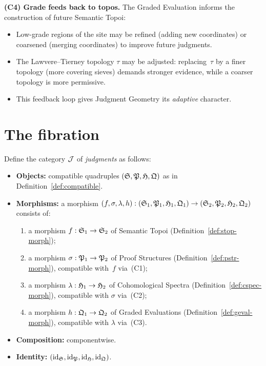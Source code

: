 \begin{definition}
\medskip
\noindent\textbf{(C4) Grade feeds back to topos.}
The Graded Evaluation informs the construction of future Semantic
Topoi:
\begin{itemize}[nosep]
\item Low-grade regions of the site may be refined (adding new
  coordinates) or coarsened (merging coordinates) to improve
  future judgments.
\item The Lawvere--Tierney topology $\tau$ may be adjusted:
  replacing~$\tau$ by a finer topology (more covering sieves)
  demands stronger evidence, while a coarser topology is more
  permissive.
\item This feedback loop gives Judgment Geometry its
  \emph{adaptive} character.
\end{itemize}
\end{definition}

\section{The fibration}
\label{sec:fibration-def}

\begin{construction}
\label{con:total-category}
Define the category $\mathcal{J}$ of \emph{judgments} as follows:
\begin{itemize}[nosep]
\item \textbf{Objects:} compatible quadruples
  $(\mathfrak{S}, \mathfrak{P}, \mathfrak{H}, \mathfrak{Q})$ as in
  Definition~\ref{def:compatible}.
\item \textbf{Morphisms:} a morphism
  $(f, \sigma, \lambda, h) :
  (\mathfrak{S}_1, \mathfrak{P}_1, \mathfrak{H}_1, \mathfrak{Q}_1) \to
  (\mathfrak{S}_2, \mathfrak{P}_2, \mathfrak{H}_2, \mathfrak{Q}_2)$
  consists of:
  \begin{enumerate}[label=(\alph*),nosep]
  \item a morphism $f : \mathfrak{S}_1 \to \mathfrak{S}_2$ of Semantic Topoi
    (Definition~\ref{def:stop-morph});
  \item a morphism $\sigma : \mathfrak{P}_1 \to \mathfrak{P}_2$ of Proof Structures
    (Definition~\ref{def:pstr-morph}), compatible with~$f$ via~(C1);
  \item a morphism $\lambda : \mathfrak{H}_1 \to \mathfrak{H}_2$ of Cohomological
    Spectra (Definition~\ref{def:cspec-morph}), compatible with
    $\sigma$ via~(C2);
  \item a morphism $h : \mathfrak{Q}_1 \to \mathfrak{Q}_2$ of Graded Evaluations
    (Definition~\ref{def:geval-morph}), compatible with $\lambda$
    via~(C3).
  \end{enumerate}
\item \textbf{Composition:} componentwise.
\item \textbf{Identity:} $(\mathrm{id}_{\mathfrak{S}}, \mathrm{id}_{\mathfrak{P}}, \mathrm{id}_{\mathfrak{H}},
  \mathrm{id}_{\mathfrak{Q}})$.
\end{itemize}
\end{construction}

